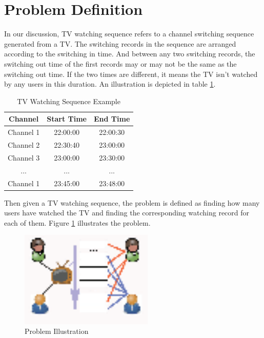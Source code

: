 \section{Problem Definition}

In our discussion, TV watching sequence refers to a channel switching sequence generated from a TV. The switching records in the
sequence are arranged according to the switching in time. And between any two switching records, the switching out time of the first
records may or may not be the same as the switching out time. If the two times are different, it means the TV isn't watched by 
any users in this duration. An illustration is depicted in table \ref{tbl:1}.

\begin{table}[!htbp]
\centering
\begin{tabular}{|c||c||c|}
\hline
Channel & Start Time & End Time\\
\hline
Channel 1 & 22:00:00 & 22:00:30\\
\hline
Channel 2 & 22:30:40 & 23:00:00\\
\hline
Channel 3 & 23:00:00 & 23:30:00\\
\hline
... & ... & ... \\
\hline
Channel 1 & 23:45:00 & 23:48:00\\
\hline
\end{tabular}
\caption{TV Watching Sequence Example}
\label{tbl:1}
\end{table}

Then given a TV watching sequence, the problem is defined as finding how many users have watched the TV and finding the corresponding
watching record for each of them. Figure \ref{fig:1} illustrates the problem.

\begin{figure}[htbp]
\centering
\includegraphics[width=2.5in]{probdef.eps}
\caption{Problem Illustration}
\label{fig:1}
\end{figure}
